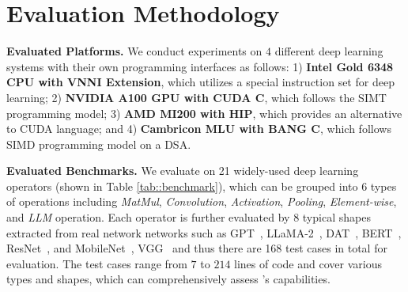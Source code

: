 
\section{Evaluation Methodology}
\label{sec:evaluation}
\vspace{-5pt}

\textbf{Evaluated Platforms.}
We conduct experiments on $4$ different deep learning systems with their own programming interfaces as follows: 1) \textbf{Intel Gold 6348 CPU with VNNI Extension}, which utilizes a special instruction set for deep learning; 2) \textbf{NVIDIA A100 GPU with CUDA C}, which follows the SIMT programming model; 3) \textbf{AMD MI200 with HIP}, which provides an alternative to CUDA language; and 4) \textbf{Cambricon MLU with BANG C}, which follows SIMD programming model on a DSA.

\textbf{Evaluated Benchmarks.}
We evaluate \name{} on 21 widely-used deep learning operators (shown in Table \ref{tab::benchmark}), which can be grouped into $6$ types of operations including \emph{MatMul}, %
\emph{Convolution}, %
\emph{Activation}, %
\emph{Pooling}, %
\emph{Element-wise}, %
and \emph{LLM} operation. %
Each operator is further evaluated by $8$ typical shapes extracted from real network networks such as GPT~\cite{GPT4}, LLaMA-2~\cite{touvron2023llama}, DAT~\cite{xia2022vision}, BERT~\cite{devlin2018bert}, ResNet~\cite{He16CVPR}, and MobileNet~\cite{howard2017mobilenets}, VGG~\cite{Simonyan15VGG} and thus there are 168 test cases in total for evaluation. The test cases range from $7$ to $214$ lines of code and cover various types and shapes, which can comprehensively assess \name{}'s capabilities.



